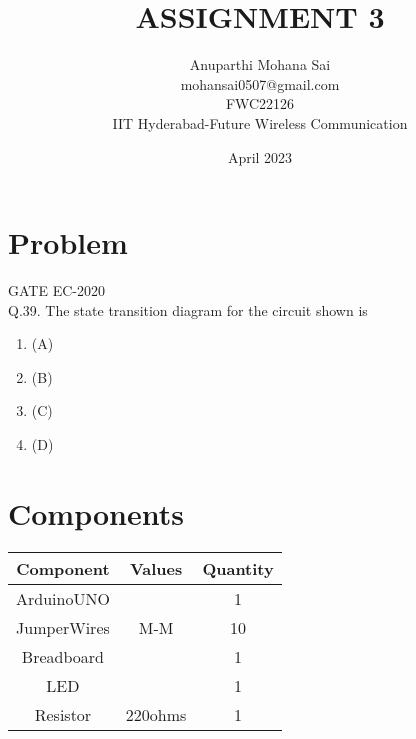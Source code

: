 \documentclass{article}
\title{ASSIGNMENT 3}
\date{April 2023}
\author{Anuparthi Mohana Sai \\mohansai0507@gmail.com\\FWC22126\\IIT Hyderabad-Future Wireless Communication }
\begin{document}
\maketitle
 \tableofcontents

\pagebreak
\section{Problem}
 {GATE EC-2020}\\
 Q.39. The state transition diagram for the circuit shown is
\begin{figure}[h]
	 \centering
	 
\end{figure}

\begin{enumerate}
\item{(A)}
        \begin{figure}[h]
	        \centering
	        
        \end{figure}
\pagebreak
\item{(B)}
        \begin{figure}[h]
         	\centering
	        
        \end{figure}
\item{(C)}
	\begin{figure}[h]
		\centering
		
	\end{figure}
\item{(D)}
	\begin{figure}[h]
		\centering
		
	\end{figure}
\end{enumerate}
\pagebreak
\section{Components}
 \begin{table}[h]
  \centering
   \begin{tabular}{|c|c|c|}
   \hline
   \textbf{Component}& \textbf{Values} & \textbf{Quantity}\\
\hline
ArduinoUNO &  & 1 \\  
\hline
JumperWires& M-M & 10 \\ 
\hline
Breadboard &  & 1 \\
\hline
LED & &1 \\
\hline
Resistor &220ohms & 1\\
\hline
   \end{tabular}
   \end{table}
\end{document}

